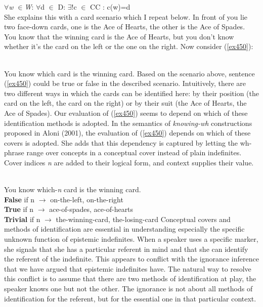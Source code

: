 \documentclass[output=paper,modfonts]{langsci/langscibook}
\begin{document}
$\forall$\emph{w} $\in$\emph{W}: $\forall$d $\in$ D: $\exists$!c $\in$ CC : c(w)=d \\

She explains this with a card scenario which I repeat below.
 In front of you lie two face-down cards, one is the Ace of Hearts, the other is the Ace of Spades. You know that the winning card is the Ace of Hearts, but you don’t know whether it’s the card on the left or the one on the right. Now consider (\ref{ex450}):

\ea\label{ex450}\\
 You know which card is the winning card.
\z Based on the scenario above, sentence (\ref{ex450}) could be true or false in the described scenario. Intuitively, there are two different ways in which the cards can be identified here: by their position (the card on the left, the card on the right) or by their suit (the Ace of Hearts, the Ace of Spades). Our evaluation of (\ref{ex450}) seems to depend on which of these identification methods is adopted. In the semantics of \emph{knowing-wh} constructions proposed in Aloni (2001), the evaluation of (\ref{ex450}) depends on which of these covers is adopted. She adds that this dependency is captured by letting the wh-phrase range over concepts in a conceptual cover instead of plain indefinites. Cover indices \emph{n} are added to their logical form, and context supplies their value. 


\ea\label{ex45}\\
 You know which-\emph{n} card is the winning card.\\
 \textbf{False} if n $\longrightarrow$ {on-the-left, on-the-right}\\
 \textbf{True} if n $\longrightarrow$ {ace-of-spades, ace-of-hearts} \\
 \textbf{Trivial} if n $\longrightarrow$ {the-winning-card, the-losing-card}
\z 
Conceptual covers and methods of identification are essential in understanding especially the specific unknown function of epistemic indefinites. When a speaker uses a specific marker, she signals that she has a particular referent in mind and that she can identify the referent of the indefinite. This appears to conflict with the ignorance inference that we have argued that epistemic indefinites have. The natural way to resolve this conflict is to assume that there are two methods of identification at play, the speaker knows one but not the other. The ignorance is not about all methods of identification for the referent, but for the essential one in that particular context.  
\end{document}
